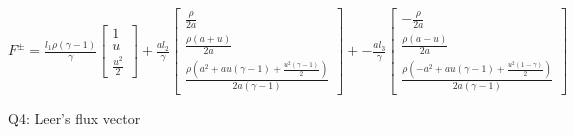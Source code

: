 \documentclass[11pt]{article}
\begin{document}
    
    $\displaystyle F^{\pm} = \frac{l_{1} \rho \left(\gamma - 1\right)}{\gamma}\left[\begin{matrix}1\\u\\\frac{u^{2}}{2}\end{matrix}\right]+\frac{a l_{2}}{\gamma}\left[\begin{matrix}\frac{\rho}{2 a}\\\frac{\rho \left(a + u\right)}{2 a}\\\frac{\rho \left(a^{2} + a u \left(\gamma - 1\right) + \frac{u^{2} \left(\gamma - 1\right)}{2}\right)}{2 a \left(\gamma - 1\right)}\end{matrix}\right]+- \frac{a l_{3}}{\gamma}\left[\begin{matrix}- \frac{\rho}{2 a}\\\frac{\rho \left(a - u\right)}{2 a}\\\frac{\rho \left(- a^{2} + a u \left(\gamma - 1\right) + \frac{u^{2} \left(1 - \gamma\right)}{2}\right)}{2 a \left(\gamma - 1\right)}\end{matrix}\right]$

    
    Q4: Leer's flux vector


    
    
    
\end{document}
